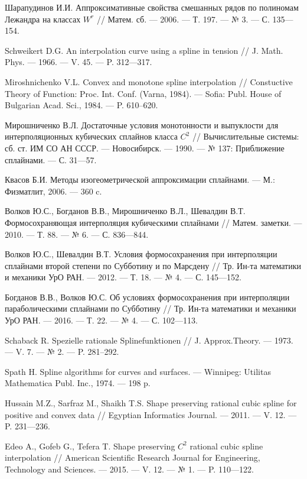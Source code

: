 \begin{thebibliography}{111}
Шарапудинов И.И. Аппроксимативные свойства смешанных рядов по полиномам Лежандра на классах $W^r$ // Матем. сб. --- 2006. --- Т. 197. --- № 3. --- С. 135---154.



Schweikert D.G. An interpolation curve using a spline in tension
// J. Math. Phys. --- 1966. --- V. 45. --- P. 312---317.


Miroshnichenko V.L. Convex and monotone spline interpolation
// Constuctive Theory of Function: Proc. Int. Conf. (Varna, 1984). --- Sofia:
Publ. House of Bulgarian Acad. Sci., 1984. --- P. 610--620.

Мирошниченко В.Л. Достаточные условия монотонности и выпуклости
для интерполяционных кубических сплайнов класса $C^2$
// Вычислительные системы: сб. ст. ИМ СО АН СССР. ---
Новосибирск. --- 1990. --- № 137: Приближение сплайнами. --- С. 31---57.

Квасов Б.И. Методы изогеометрической аппроксимации сплайнами. --- М.: Физматлит, 2006. --- 360 c.

Волков Ю.С., Богданов В.В., Мирошниченко В.Л., Шевалдин В.Т.
Формосохраняющая интерполяция кубическими сплайнами // Матем. заметки. --- 2010. --- Т. 88. --- № 6. --- С. 836---844.

Волков Ю.С., Шевалдин В.Т.
Условия формосохранения при интерполяции сплайнами второй степени по Субботину и по Марсдену
// Тр. Ин-та математики и механики УрО РАН. --- 2012. --- Т. 18. --- № 4. --- С. 145---152.

Богданов В.В., Волков Ю.С.
Об условиях формосохранения при интерполяции параболическими сплайнами по Субботину
// Тр. Ин-та математики и механики УрО РАН. --- 2016. --- Т. 22. --- № 4. --- С. 102---113.

Schaback R. Spezielle rationale Splinefunktionen
// J. Approx.Theory. --- 1973. --- V. 7. --- № 2. --- P. 281--292.

Spath H. Spline algorithms for curves and surfaces. --- Winnipeg: Utilitas Mathematica Publ. Inc., 1974. --- 198 p.

Hussain M.Z., Sarfraz M., Shaikh T.S.
Shape preserving rational cubic spline for positive and convex data
// Egyptian Informatics Journal. --- 2011. --- V. 12. --- P. 231---236.

Edeo A., Gofeb G., Tefera T. Shape preserving $C^2$ rational
 cubic spline interpolation // American Scientific Research Journal for Engineering, Technology and Sciences. ---
 2015. --- V. 12. --- № 1. --- P. 110---122.


\end{thebibliography}

